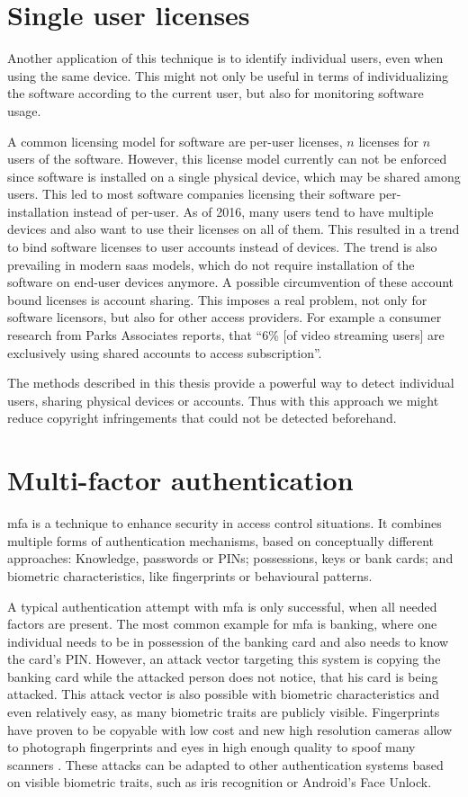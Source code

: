 \section{Single user licenses}
Another application of this technique is to identify individual users, even when using the same device. This might not only be useful in terms of individualizing the software according to the current user, but also for monitoring software usage.

A common licensing model for software are per-user licenses, \ie $n$ licenses for $n$ users of the software. However, this license model currently can not be enforced since software is installed on a single physical device, which may be shared among users. This led to most software companies licensing their software per-installation instead of per-user.
As of 2016, many users tend to have multiple devices and also want to use their licenses on all of them. This resulted in a trend to bind software licenses to user accounts instead of devices. The trend is also prevailing in modern \gls{saas} models, which do not require installation of the software on end-user devices anymore.
A possible circumvention of these account bound licenses is account sharing. This imposes a real problem, not only for software licensors, but also for other access providers. For example a consumer research from Parks Associates \cite{accountsharing} reports, that ``6\% [of video streaming users] are exclusively using shared accounts to access subscription''. 

The methods described in this thesis provide a powerful way to detect individual users, sharing physical devices or accounts. Thus with this approach we might reduce copyright infringements that could not be detected beforehand.

\section{Multi-factor authentication}
\gls{mfa} is a technique to enhance security in access control situations. It combines multiple forms of authentication mechanisms, based on conceptually different approaches: Knowledge, \eg passwords or PINs; possessions, \eg keys or bank cards; and biometric characteristics, like fingerprints or behavioural patterns.

A typical authentication attempt with \gls{mfa} is only successful, when all needed factors are present. The most common example for \gls{mfa} is banking, where one individual needs to be in possession of the banking card and also needs to know the card's PIN. However, an attack vector targeting this system is copying the banking card while the attacked person does not notice, that his card is being attacked. This attack vector is also possible with biometric characteristics and even relatively easy, as many biometric traits are publicly visible. Fingerprints have proven to be copyable with low cost \cite{starbug2008bastel} and new high resolution cameras allow to photograph fingerprints and eyes in high enough quality to spoof many scanners \cite{fiebig2014security}. These attacks can be adapted to other authentication systems based on visible biometric traits, such as iris recognition or Android's Face Unlock.

